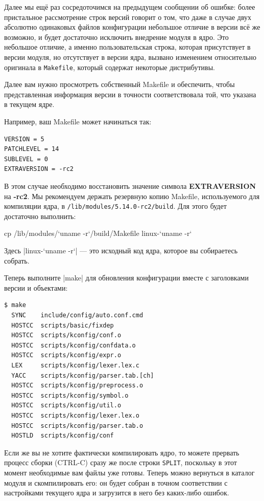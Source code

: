 \documentclass[10pt, oneside]{book}
\begin{document}
Далее мы ещё раз сосредоточимся на предыдущем сообщении об ошибке: более пристальное рассмотрение строк версий говорит о том, что даже в случае двух абсолютно одинаковых файлов конфигурации небольшое отличие в версии всё же возможно, и будет достаточно исключить внедрение модуля в ядро.
Это небольшое отличие, а именно пользовательская строка, которая присутствует в версии модуля, но отсутствует в версии ядра, вызвано изменением относительно оригинала в \verb|Makefile|, который содержат некоторые дистрибутивы.

Далее вам нужно просмотреть собственный Makefile и обеспечить, чтобы представленная информация версии в точности соответствовала той, что указана в текущем ядре.

Например, ваш Makefile может начинаться так:

\begin{verbatim}
VERSION = 5
PATCHLEVEL = 14
SUBLEVEL = 0
EXTRAVERSION = -rc2
\end{verbatim}

В этом случае необходимо восстановить значение символа \textbf{EXTRAVERSION} на \textbf{-rc2}.
Мы рекомендуем держать резервную копию Makefile, используемого для компиляции ядра, в \verb|/lib/modules/5.14.0-rc2/build|.
Для этого будет достаточно выполнить:
\begin{codebash}
cp /lib/modules/`uname -r`/build/Makefile linux-`uname -r`
\end{codebash}
Здесь \sh|linux-`uname -r`| — это исходный код ядра, которое вы собираетесь собрать.

Теперь выполните \sh|make| для обновления конфигурации вместе с заголовками версии и объектами:

\begin{verbatim}
$ make
  SYNC    include/config/auto.conf.cmd
  HOSTCC  scripts/basic/fixdep
  HOSTCC  scripts/kconfig/conf.o
  HOSTCC  scripts/kconfig/confdata.o
  HOSTCC  scripts/kconfig/expr.o
  LEX     scripts/kconfig/lexer.lex.c
  YACC    scripts/kconfig/parser.tab.[ch]
  HOSTCC  scripts/kconfig/preprocess.o
  HOSTCC  scripts/kconfig/symbol.o
  HOSTCC  scripts/kconfig/util.o
  HOSTCC  scripts/kconfig/lexer.lex.o
  HOSTCC  scripts/kconfig/parser.tab.o
  HOSTLD  scripts/kconfig/conf
\end{verbatim}

Если же вы не хотите фактически компилировать ядро, то можете прервать процесс сборки (CTRL-C) сразу же после строки \verb|SPLIT|, поскольку в этот момент необходимые вам файлы уже готовы.
Теперь можно вернуться в каталог модуля и скомпилировать его: он будет собран в точном соответствии с настройками текущего ядра и загрузится в него без каких-либо ошибок.
\end{document}
